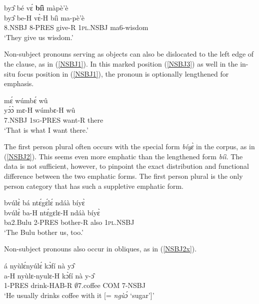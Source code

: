 \begin{exe} 
\ex\label{NSBJ3}
  \glll byɔ̂ bé vɛ́ {\bfseries bíì} màpè'è \\
        byɔ̂ be-H vɛ̀-H bíì ma-pè'è \\
        8.NSBJ 8-PRES give-R 1\textsc{pl}.NSBJ ma6-wisdom  \\
    \trans `They give us wisdom.'
\end{exe}

Non-subject pronouns serving as objects can also be dislocated to the left edge of the clause, as in (\ref{NSBJ1}).  In this marked position (\ref{NSBJ3}) as well in the in-situ focus position in (\ref{NSBJ1}), the pronoun is optionally lengthened for emphasis. 

\begin{exe} 
\ex\label{NSBJ1} 
   mɛ́ wúmbɛ́ wû \\
        yɔ́ɔ̀ mɛ-H wúmbɛ-H wû \\
         7.NSBJ 1\textsc{sg}-PRES want-R there \\
    \trans `That is what I want there.'
\end{exe}

The first person plural often occurs with the special form {\itshape bíyɛ̀} in the corpus, as in (\ref{NSBJ2}). This seems even more emphatic than the lengthened form {\itshape bíì}. The data is not sufficient, however, to pinpoint the exact distribution and functional difference between the two emphatic forms. The first person plural is the only person category that has such a suppletive emphatic form.

\begin{exe} 
\ex\label{NSBJ2} 
  \glll bvúlɛ̀ bá ntɛ́gɛ́lɛ́ ndáà bíyɛ̀ \\
       bvúlɛ̀ ba-H ntɛ́gɛlɛ-H ndáà bíyɛ̀ \\
         ba2.Bulu 2-PRES bother-R also 1\textsc{pl}.NSBJ   \\
    \trans `The Bulu bother us, too.'
\end{exe}

\noindent Non-subject pronouns also occur in obliques, as in (\ref{NSBJ2x}).

\begin{exe} 
\ex\label{NSBJ2x} 
  \glll á nyùlɛ́nyúlɛ́  kɔ̀fí nà yɔ̂ \\
       a-H nyùlɛ-nyulɛ-H  kɔ̀fí nà y-ɔ̂  \\
         1-PRES drink-HAB-R $\emptyset$7.coffee COM 7-NSBJ   \\
    \trans `He usually drinks coffee with it [= {\itshape ngùɔ́} `sugar']'
\end{exe}

